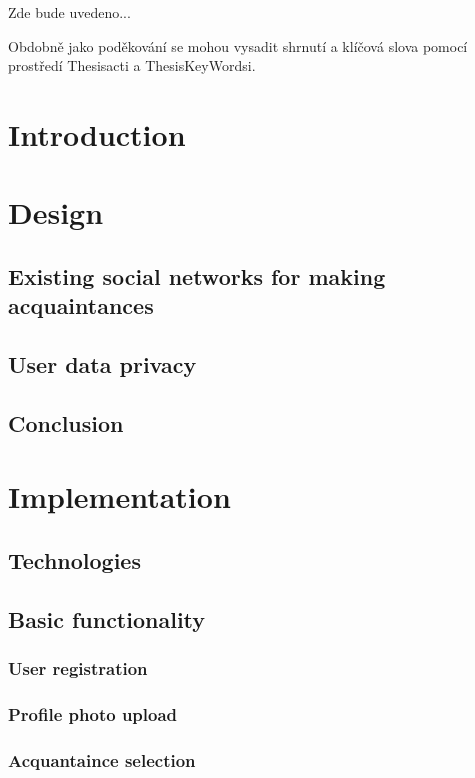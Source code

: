 \documentclass[11pt,draft,oneside]{fithesis}
\begin{document}
\FrontMatter
\ThesisTitlePage

\begin{ThesisDeclaration}
\DeclarationText
\AdvisorName
\end{ThesisDeclaration}

\begin{ThesisThanks}
Zde bude uvedeno... 
\end{ThesisThanks}

Obdobně jako poděkování se mohou vysadit shrnutí a klíčová 
slova pomocí prostředí Thesisacti a ThesisKeyWordsi.

\MainMatter
\tableofcontents
\chapter*{Introduction}
\chapter{Design}
\section{Existing social networks for making acquaintances}
\section{User data privacy}
\section{Conclusion}

\chapter{Implementation}
\section{Technologies}
\section{Basic functionality}
	\subsection{User registration}
	\subsection{Profile photo upload}
	\subsection{Acquantaince selection}
\end{document}
